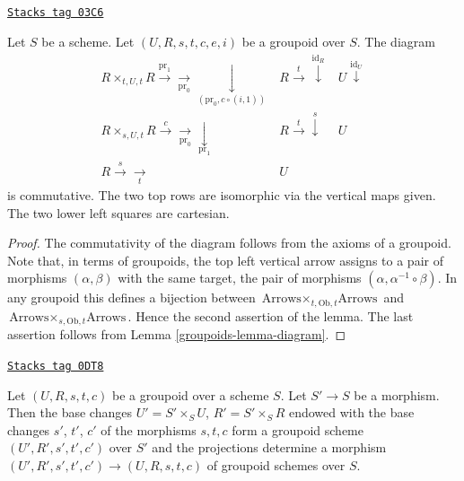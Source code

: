 \begin{lemma}
\label{groupoids-lemma-diagram-pull}
\href{https://stacks.math.columbia.edu/tag/03C6}{\texttt{Stacks tag 03C6}}

Let $S$ be a scheme.
Let $(U, R, s, t, c, e, i)$ be a groupoid over $S$.
The diagram
\begin{equation}
\label{equation-pull}
\begin{array}{ccc}R \times_{t, U, t} R
\overset{\text{pr}_1}{\longrightarrow}\underset{\text{pr}_0}{\longrightarrow}\underset{(\text{pr}_0, c \circ (i, 1))}{\downarrow} & R \overset{t}{\longrightarrow}\overset{\text{id}_R}{\downarrow} & U \overset{\text{id}_U}{\downarrow} \\ R \times_{s, U, t} R
\overset{c}{\longrightarrow}\underset{\text{pr}_0}{\longrightarrow}\underset{\text{pr}_1}{\downarrow} & R \overset{t}{\longrightarrow}\overset{s}{\downarrow} & U \\ R \overset{s}{\longrightarrow}\underset{t}{\longrightarrow} & U & \end{array}
\end{equation}
is commutative. The two top rows are isomorphic via the vertical maps given.
The two lower left squares are cartesian.
\end{lemma}

\begin{proof}

The commutativity of the diagram follows from the axioms of a groupoid.
Note that, in terms of groupoids, the top left vertical arrow assigns to
a pair of morphisms $(\alpha, \beta)$ with the same target, the pair
of morphisms $(\alpha, \alpha^{-1} \circ \beta)$. In any groupoid
this defines a bijection between
$\text{Arrows} \times_{t, \text{Ob}, t} \text{Arrows}$
and
$\text{Arrows} \times_{s, \text{Ob}, t} \text{Arrows}$. Hence the second
assertion of the lemma.
The last assertion follows from Lemma \ref{groupoids-lemma-diagram}.
\end{proof}

\begin{lemma}
\label{groupoids-lemma-base-change-groupoid}
\href{https://stacks.math.columbia.edu/tag/0DT8}{\texttt{Stacks tag 0DT8}}

Let $(U, R, s, t, c)$ be a groupoid over a scheme $S$.
Let $S' \to S$ be a morphism. Then the base changes $U' = S' \times_S U$,
$R' = S' \times_S R$ endowed with the base changes $s'$, $t'$, $c'$
of the morphisms $s, t, c$ form a groupoid scheme
$(U', R', s', t', c')$ over $S'$ and the projections
determine a morphism
$(U', R', s', t', c') \to (U, R, s, t, c)$
of groupoid schemes over $S$.
\end{lemma}

